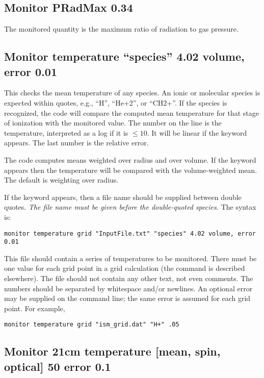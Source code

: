 \subsection{Monitor PRadMax 0.34}

The monitored quantity is the maximum ratio of radiation to gas pressure.

\subsection{Monitor temperature ``species'' 4.02 volume, error 0.01}

This checks the mean temperature of any species.
An ionic or molecular species is expected within quotes,
e.g., ``H'', ``He+2'', or ``CH2+''.
If the species is recognized, the code will compare the computed mean
temperature for that stage of ionization with the monitored value.
The number on the line is the temperature, interpreted as a log if
it is $\le 10$.
It will be linear if the keyword  appears.
The last number is the relative error.

The code computes means weighted over radius and over volume.
If the keyword  appears then the temperature will
be compared with the volume-weighted mean.
The default is weighting over radius.

If the keyword  appears, then a file name should be supplied
between double quotes.
\textit{The file name must be given before the double-quoted species.}
The syntax is:
%
\begin{verbatim}
monitor temperature grid "InputFile.txt" "species" 4.02 volume, error 0.01
\end{verbatim}
%
This file should contain a series of temperatures to be monitored.
There must be one value for each grid point in a grid calculation
(the  command is described elsewhere). The file should not contain
any other text, not even comments. The numbers should be separated by whitespace
and/or newlines.
An optional error may be supplied on the command line; the same error is
assumed for each grid point.
For example,
%
\begin{verbatim}
monitor temperature grid "ism_grid.dat" "H+" .05
\end{verbatim}
%

\subsection{Monitor 21cm temperature [mean, spin, optical] 50 error 0.1}

